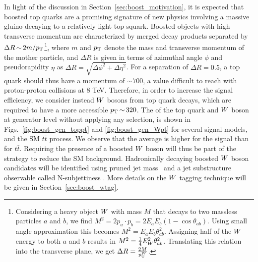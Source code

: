 

In light of the discussion in Section~\ref{sec:boost_motivation}, it is expected that boosted top
quarks are a promising signature of new physics involving a massive gluino decaying to a relatively
light top squark.
Boosted objects with high transverse momentum are characterized by merged decay products
separated by $ \Delta R \,{\sim}\, 2m/p_{\mathrm{T}}$\footnote{Considering a heavy object $W$ with mass $M$
that decays to two massless particles $a$ and $b$, we find $M^2 = 2 p_a \cdot p_b = 2 E_a E_b (1
- \cos{\theta_{ab}})$. Using small angle approximation this becomes $M^2 = E_a E_b
\theta_{ab}^2$. Assigning half of the $W$ energy to both $a$ and $b$ results in $M^2 =
\frac{1}{4} E_{W}^2 \theta_{ab}^2$. Translating this relation into the transverse plane, we get
$\Delta R = \frac{2 M}{p_{\mathrm{T}}^{W}}$.}, 
where $m$ and $p_{\mathrm{T}}$ denote the mass and transverse momentum of the mother particle, and $\Delta R$
is given in terms of azimuthal angle $\phi$ and pseudorapidity $\eta$ as $\Delta R = \sqrt{\Delta
\phi^2 + \Delta \eta^2}$.
For a separation of $\Delta R = 0.5$, a top quark should thus have a momentum of ${\sim}700$\GeV, a
value difficult to reach with proton-proton collisions at 8 TeV. Therefore, in order to increase the
signal efficiency, we consider instead $W$ bosons from top quark decays, which are required to have
a more accessible $p_{\mathrm{T}} \,{\sim}\, 320$\GeV.  The \pt of the top quark and $W$ boson at generator
level without applying any selection, is shown in Figs.~\ref{fig:boost_gen_toppt} and
\ref{fig:boost_gen_Wpt} for several signal models, and the SM $t\bar{t}$ process. 
We observe that the average \pt is higher for the signal than for $t\bar{t}$. Requiring the
presence of a boosted $W$ boson will thus be part of the strategy to reduce the SM background.
Hadronically decaying boosted $W$ boson candidates will be identified using pruned jet
mass~\cite{Ellis:2009su,Ellis:2009me,Chatrchyan:2013vbb} and a jet substructure observable
called N-subjettiness \cite{Thaler:2010tr}. More details on the $W$ tagging technique will be given
in Section~\ref{sec:boost_wtag}. 

